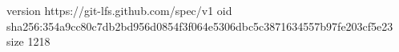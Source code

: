 version https://git-lfs.github.com/spec/v1
oid sha256:354a9cc80c7db2bd956d0854f3f064e5306dbc5c3871634557b97fe203cf5e23
size 1218
